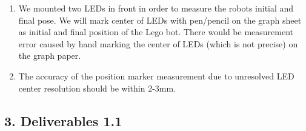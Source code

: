 \begin{enumerate}

\item We mounted two LEDs in front in order to measure the robots initial and final pose. We will mark center of LEDs with pen/pencil on the graph sheet as initial and final position of the Lego bot. There would be measurement error caused by hand marking the center of LEDs (which is not precise) on the graph paper.

\item The accuracy of the position marker measurement due to unresolved LED center resolution should be within 2-3mm.
\end{enumerate}

\subsection*{3. Deliverables 1.1}
